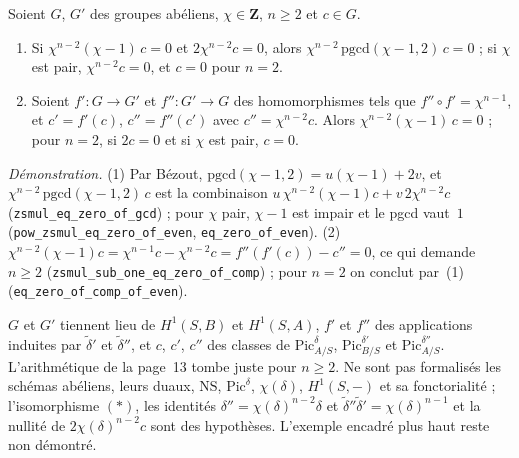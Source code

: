 \begin{encadre}
\begin{enonce}
Soient $G$, $G'$ des groupes abéliens, $\chi \in \mathbf Z$, $n \geq 2$ et $c \in G$.
\begin{enumerate}
\item Si $\chi^{n-2}(\chi - 1)\,c = 0$ et $2\chi^{n-2}c = 0$, alors $\chi^{n-2}\,\mathrm{pgcd}(\chi - 1, 2)\,c = 0$ ; si $\chi$ est pair, $\chi^{n-2}c = 0$, et $c = 0$ pour $n = 2$.
\item Soient $f' : G \to G'$ et $f'' : G' \to G$ des homomorphismes tels que $f'' \circ f' = \chi^{n-1}$, et $c' = f'(c)$, $c'' = f''(c')$ avec $c'' = \chi^{n-2}c$. Alors $\chi^{n-2}(\chi - 1)\,c = 0$ ; pour $n = 2$, si $2c = 0$ et si $\chi$ est pair, $c = 0$.
\end{enumerate}
\end{enonce}
\end{encadre}
{\small \emph{Démonstration.} (1) Par Bézout, $\mathrm{pgcd}(\chi - 1, 2) = u(\chi - 1) + 2v$, et $\chi^{n-2}\,\mathrm{pgcd}(\chi - 1, 2)\,c$ est la combinaison $u\,\chi^{n-2}(\chi - 1)c + v\,2\chi^{n-2}c$ (\texttt{zsmul\_eq\_zero\_of\_gcd}) ; pour $\chi$ pair, $\chi - 1$ est impair et le pgcd vaut~$1$ (\texttt{pow\_zsmul\_eq\_zero\_of\_even}, \texttt{eq\_zero\_of\_even}). (2) $\chi^{n-2}(\chi - 1)c = \chi^{n-1}c - \chi^{n-2}c = f''(f'(c)) - c'' = 0$, ce qui demande $n \geq 2$ (\texttt{zsmul\_sub\_one\_eq\_zero\_of\_comp}) ; pour $n = 2$ on conclut par~(1) (\texttt{eq\_zero\_of\_comp\_of\_even}).

$G$ et $G'$ tiennent lieu de $H^1(S, B)$ et $H^1(S, A)$, $f'$ et $f''$ des applications induites par $\tilde\delta'$ et $\tilde\delta''$, et $c$, $c'$, $c''$ des classes de $\mathrm{Pic}^\delta_{A/S}$, $\mathrm{Pic}^{\delta'}_{B/S}$ et $\mathrm{Pic}^{\delta''}_{A/S}$. L'arithmétique de la page~13 tombe juste pour $n \geq 2$. Ne sont pas formalisés les schémas abéliens, leurs duaux, $\mathrm{NS}$, $\mathrm{Pic}^\delta$, $\chi(\delta)$, $H^1(S, -)$ et sa fonctorialité ; l'isomorphisme $(\ast)$, les identités $\delta'' = \chi(\delta)^{n-2}\delta$ et $\tilde\delta''\tilde\delta' = \chi(\delta)^{n-1}$ et la nullité de $2\chi(\delta)^{n-2}c$ sont des hypothèses. L'exemple encadré plus haut reste non démontré.\par}

